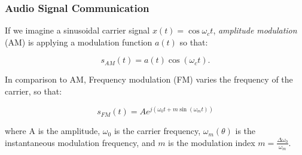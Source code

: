 \subsubsection*{Audio Signal Communication}

If we imagine a sinusoidal carrier signal $x(t) = \cos \omega_c t$, \emph{amplitude modulation} (AM) is applying a modulation function $a(t)$ so that:


\begin{equation*}
    s_{AM}(t) = a(t) \cos \left( \omega_{c} t\right).    
\end{equation*}

In comparison to AM, Frequency modulation (FM) varies the frequency of the carrier, so that:

\begin{equation*}
    s_{FM}(t) = A e^{j\left(\omega_{0} t + m \sin \left(\omega_ { m } t \right)\right)}
\end{equation*}

where A is the amplitude, $\omega_0$ is the carrier frequency, $\omega_m(\theta)$ is the instantaneous modulation frequency, and $m$ is the modulation index $m = \frac{\Delta \omega_0} { \omega_{m} }$.

